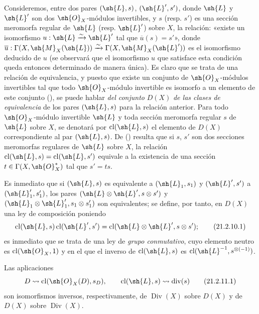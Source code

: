\begin{env}[21.2.10]
\label{IV.21.2.10}
Consideremos, entre dos pares $(\sh{L},s)$, $(\sh{L}',s')$, donde $\sh{L}$ y $\sh{L}'$ son dos $\sh{O}_X$-módulos invertibles, y $s$ (resp. $s'$) es una sección meromorfa regular de $\sh{L}$ (resp. $\sh{L}'$) sobre $X$, la relación: «existe un isomorfismo $u:\sh{L}\xrightarrow{\sim}\sh{L}'$ tal que $\overline{u}(s)=s'$», donde $\overline{u}:\Gamma(X,\sh{M}_X(\sh{L}))\xrightarrow{\sim}\Gamma(X,\sh{M}_X(\sh{L}'))$ es el isomorfismo deducido de $u$ (se observará que el isomorfismo $u$ que satisface esta condición queda entonces determinado de manera única).
Es claro que se trata de una relación de equivalencia, y puesto que existe un conjunto de $\sh{O}_X$-módulos invertibles tal que todo $\sh{O}_X$-módulo invertible es isomorfo a un elemento de este conjunto (), se puede hablar \emph{del conjunto} $D(X)$ \emph{de las clases de equivalencia} de los pares $(\sh{L},s)$ para la relación anterior.
Para todo $\sh{O}_X$-módulo invertible $\sh{L}$ y toda sección
meromorfa regular $s$ de $\sh{L}$ sobre $X$, se denotará por $\operatorname{cl}(\sh{L},s)$ el elemento de $D(X)$ correspondiente al par $(\sh{L},s)$.
De () resulta que si $s$, $s'$ son dos secciones meromorfas regulares de $\sh{L}$ sobre $X$, la relación $\operatorname{cl}(\sh{L},s)=\operatorname{cl}(\sh{L},s')$ equivale a la existencia de una sección $t\in\Gamma(X,\sh{O}_X^*)$ tal que $s'=ts$.

Es inmediato que si $(\sh{L},s)$ es equivalente a $(\sh{L}_1,s_1)$ y $(\sh{L}',s')$ a $(\sh{L}_1',s_1')$, los pares $(\sh{L}\otimes\sh{L}',s\otimes s')$ y $(\sh{L}_1\otimes\sh{L}_1',s_1\otimes s_1')$ son equivalentes;
se define, por tanto, en $D(X)$ una ley de composición poniendo
\[
\label{IV.21.2.10.1}
  \operatorname{cl}(\sh{L},s)\operatorname{cl}(\sh{L}',s')=\operatorname{cl}(\sh{L}\otimes\sh{L}',s\otimes s');
  \tag{21.2.10.1}
\]
es inmediato que se trata de una ley de \emph{grupo conmutativo}, cuyo elemento neutro es $\operatorname{cl}(\sh{O}_X,1)$ y en el que el inverso de $\operatorname{cl}(\sh{L},s)$ es $\operatorname{cl}(\sh{L}^{-1},s^{\otimes(-1)})$.
\end{env}

\begin{proposition}[21.2.11]
\label{IV.21.2.11}
Las aplicaciones
\[
\label{IV.21.2.11.1}
  D\leadsto\operatorname{cl}(\sh{O}_X(D),s_D),\qquad \operatorname{cl}(\sh{L},s)\leadsto\operatorname{div}(s)
  \tag{21.2.11.1}
\]
son isomorfismos inversos, respectivamente, de $\operatorname{Div}(X)$ sobre $D(X)$ y de $D(X)$ sobre $\operatorname{Div}(X)$.
\end{proposition}

